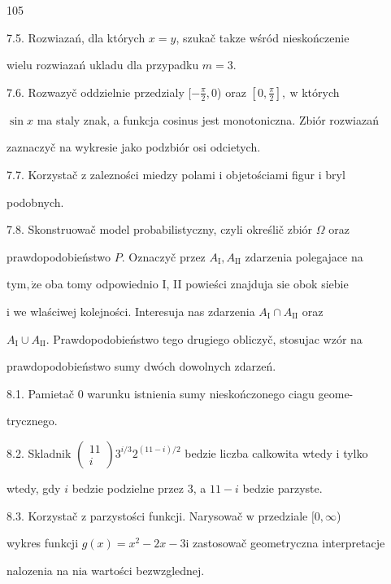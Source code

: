\documentclass[a4paper,12pt]{article}
\begin{document}
105

7.5. Rozwiazań, dla których $x=y$, szukač takze wśród nieskończenie

wielu rozwiazań ukladu dla przypadku $m=3.$

7.6. Rozwazyč oddzielnie przedzialy $[-\displaystyle \frac{\pi}{2},0$) oraz $[0,\displaystyle \frac{\pi}{2}],\ \mathrm{w}$ których

$\sin x$ ma staly znak, a funkcja cosinus jest monotoniczna. Zbiór rozwiazań

zaznaczyč na wykresie jako podzbiór osi odcietych.

7.7. Korzystač $\mathrm{z}$ zalezności miedzy polami $\mathrm{i}$ objetościami figur $\mathrm{i}$ bryl

podobnych.

7.8. Skonstruowač model probabilistyczny, czyli określič zbiór $\Omega$ oraz

prawdopodobieństwo $P$. Oznaczyč przez $A_{\mathrm{I}}, A_{\mathrm{I}\mathrm{I}}$ zdarzenia polegajace na

$\mathrm{t}\mathrm{y}\mathrm{m}, \dot{\mathrm{z}}\mathrm{e}$ oba tomy odpowiednio I, II powieści znajduja $\mathrm{s}\mathrm{i}\mathrm{e}$ obok siebie

$\mathrm{i}$ we wlaściwej kolejności. Interesuja nas zdarzenia $A_{\mathrm{I}} \cap A_{\mathrm{I}\mathrm{I}}$ oraz

$A_{\mathrm{I}}\cup A_{\mathrm{I}\mathrm{I}}$. Prawdopodobieństwo tego drugiego obliczyč, stosujac wzór na

prawdopodobieństwo sumy dwóch dowolnych zdarzeń.

8.1. Pamietač $0$ warunku istnienia sumy nieskończonego ciagu geome-

trycznego.

8.2. Skladnik $\left(\begin{array}{l}
11\\
i
\end{array}\right)3^{i/3}2^{(11-i)/2}$ bedzie liczba calkowita wtedy $\mathrm{i}$ tylko

wtedy, gdy $i$ bedzie podzielne przez 3, a $11-i$ bedzie parzyste.

8.3. Korzystač $\mathrm{z}$ parzystości funkcji. Narysowač $\mathrm{w}$ przedziale $[0,\infty$)

wykres funkcji $g(x)=x^{2}-2x-3\mathrm{i}$ zastosowač geometryczna interpretacje

nalozenia na $\mathrm{n}\mathrm{i}\mathrm{a}$ wartości bezwzglednej.
\end{document}
